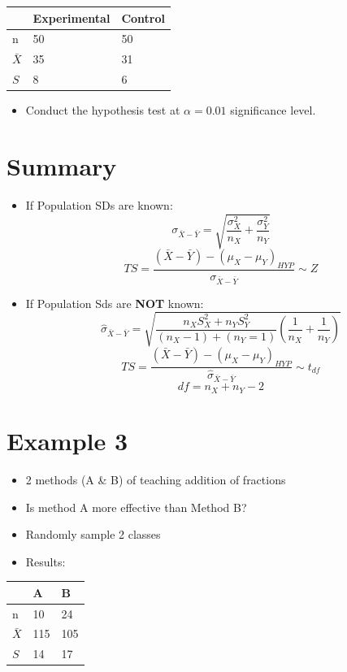\documentclass[12pt]{article}
\begin{document}
\begin{longtable}[c]{@{}lll@{}}
\toprule
& Experimental & Control\tabularnewline
\midrule
\endhead
n & 50 & 50\tabularnewline
\(\bar{X}\) & 35 & 31\tabularnewline
\(S\) & 8 & 6\tabularnewline
\bottomrule
\end{longtable}

\begin{itemize}
\itemsep1pt\parskip0pt
\item
  Conduct the hypothesis test at \(\alpha = 0.01\) significance level.
\end{itemize}

\section{Summary}\label{summary}

\begin{itemize}
\itemsep1pt\parskip0pt
\item
  If Population SDs are known:
  \[ \sigma_{\bar{X} - \bar{Y}} = \sqrt{\frac{\sigma_{X}^{2}}{n_{X}} + \frac{\sigma_{Y}^{2}}{n_{Y}}} \]
  \[ TS = \frac{(\bar{X} - \bar{Y}) - (\mu_{X} - \mu_{Y})_{HYP}}{\sigma_{\bar{X} - \bar{Y}}} \sim Z \]
\item
  If Population Sds are \textbf{NOT} known:
  \[ \hat{\sigma}_{\bar{X} - \bar{Y}} = \sqrt{\frac{n_{X}S^2_{X} + n_{Y}S^2_{Y}}{(n_{X} - 1) + (n_{Y} = 1)} \left(\frac{1}{n_{X}} + \frac{1}{n_{Y}}\right)} \]
  \[ TS = \frac{(\bar{X} - \bar{Y}) - (\mu_{X} - \mu_{Y})_{HYP}}{\hat{\sigma}_{\bar{X} - \bar{Y}}} \sim t_{df} \]
  \[ df = n_{X} + n_{Y} - 2 \]
\end{itemize}

\section{Example 3}\label{example-3}

\begin{itemize}
\itemsep1pt\parskip0pt
\item
  2 methods (A \& B) of teaching addition of fractions
\item
  Is method A more effective than Method B?
\item
  Randomly sample 2 classes
\item
  Results:
\end{itemize}

\begin{longtable}[c]{@{}lll@{}}
\toprule
& A & B\tabularnewline
\midrule
\endhead
n & 10 & 24\tabularnewline
\(\bar{X}\) & 115 & 105\tabularnewline
\(S\) & 14 & 17\tabularnewline
\bottomrule
\end{longtable}
\end{document}
